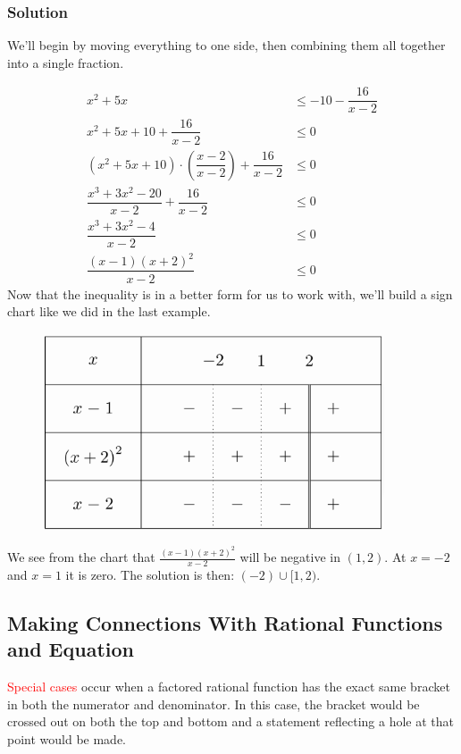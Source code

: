 \documentclass{article}
\begin{document}
\subsubsection*{Solution}
We’ll begin by moving everything to one side, then combining them all together into a single fraction.

\begin{align*} 
         x^2 + 5x &\leq -10 -\dfrac{16}{x-2}\\
      x^2 + 5x +10 +\dfrac{16}{x-2} &\leq 0\\
      \left(x^2+5x+10\right) \cdot \left(\dfrac{x-2}{x-2}\right) +\dfrac{16}{x-2} &\leq 0\\
      \dfrac{x^3+3x^2-20}{x-2} + \dfrac{16}{x-2} &\leq 0\\    
      \dfrac{x^3+3x^2-4}{x-2} &\leq 0\\
      \dfrac{(x-1)(x+2)^2}{x-2} &\leq 0
    \end{align*}
    Now that the inequality is in a better form for us to work with, we’ll build a sign chart like we did in the last example.

    \begin{figure}[ht]
    \centering
    \includegraphics[width=0.9\textwidth]{imgs/graph figure.png}
    \end{figure}
We see from the chart that $\displaystyle \frac{(x-1)(x+2)^2}{x-2}$ will be negative in $(1,2)$. At $x=-2$ and $x=1$ it is zero. The solution is then: $(-2) \cup [1,2)$.
\newpage
\subsection{Making Connections With Rational Functions and Equation}
\textcolor{red}{Special cases} occur when a factored rational function has the exact same bracket in both the numerator and denominator. In this case, the
bracket would be crossed out on both the top and bottom and a statement reflecting a hole at that point would be made.
\newpage
\end{document}
